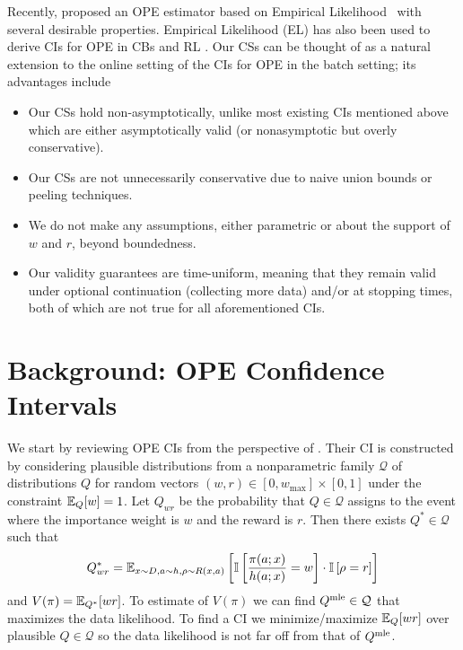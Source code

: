 Recently, \citet{kallus2019intrinsically} proposed an OPE estimator based on
Empirical Likelihood~\cite{owen2001empirical} with several desirable
properties. Empirical Likelihood (EL) has also been used to derive CIs for OPE
in CBs \cite{karampatziakis2019empirical} and RL \cite{dai2020coindice}. Our
CSs can be thought of as a natural extension to the online setting of the CIs
for OPE in the batch setting; its advantages include
\begin{itemize}\setlength\itemsep{-0.1em}
\item Our CSs hold non-asymptotically, unlike most existing CIs mentioned above which are either asymptotically valid (or nonasymptotic but overly conservative).
\item Our CSs are not unnecessarily conservative due to naive union bounds or peeling techniques.
\item We do not make any assumptions, either parametric 
or about the support of $w$ and $r$, beyond boundedness.
\item Our validity guarantees are time-uniform, meaning that they remain valid under optional continuation (collecting more data) and/or at stopping times, both of which are not true for all aforementioned CIs.
\end{itemize}

\section{Background: OPE Confidence Intervals}
We start by reviewing OPE CIs from the perspective of
\citet{karampatziakis2019empirical}. Their CI is constructed by considering
plausible distributions from a nonparametric family $\mathcal{Q}$ of
distributions  $Q$ for random vectors $(w,r) \in [0,w_{\max}]\times [0,1]$
under the constraint $\mathbb{E}_Q[w]=1$. Let $Q_{wr}$ be the probability that $Q \in
\mathcal{Q}$ assigns to the event where the importance weight is $w$ and the
reward is $r$. Then there exists $Q^* \in \mathcal{Q}$ such that
\[
Q^*_{wr}=\mathbb{E}_{x\sim D,a\sim h,\rho\sim R(x,a)}
\left[
\mathbb{I}\left[\frac{\pi(a;x)}{h(a;x)}=w\right]\cdot
\mathbb{I}\left[\rho=r\right]
\right]
\]
and 
$
V(\pi)=\mathbb{E}_{Q^*}[wr]
$.
To estimate of $V(\pi)$ we can find $Q^{\textrm{mle}} \in \mathcal{Q}$ that maximizes
the data likelihood. To find a CI we minimize/maximize $\mathbb{E}_Q[wr]$ over
plausible $Q \in \mathcal{Q}$ so the data likelihood is not far off from that
of $Q^{\textrm{mle}}$.

